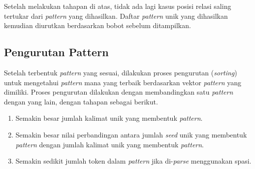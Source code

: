 \noindent Setelah melakukan tahapan di atas, tidak ada lagi kasus posisi relasi saling tertukar dari \textit{pattern} yang dihasilkan. Daftar \textit{pattern} unik yang dihasilkan kemudian diurutkan berdasarkan bobot sebelum ditampilkan.
%


\subsection{Pengurutan Pattern}
Setelah terbentuk \textit{pattern} yang sesuai, dilakukan proses pengurutan (\textit{sorting}) untuk mengetahui \textit{pattern} mana yang terbaik berdasarkan vektor \textit{pattern} yang dimiliki. Proses pengurutan dilakukan dengan membandingkan satu \textit{pattern} dengan yang lain, dengan tahapan sebagai berikut.
\begin{enumerate}
  \item Semakin besar jumlah kalimat unik yang membentuk \textit{pattern}.
  \item Semakin besar nilai perbandingan antara jumlah \textit{seed} unik yang membentuk \textit{pattern} dengan jumlah kalimat unik yang membentuk \textit{pattern}.
  \item Semakin sedikit jumlah token dalam \textit{pattern} jika di-\textit{parse} menggunakan spasi.
\end{enumerate}

